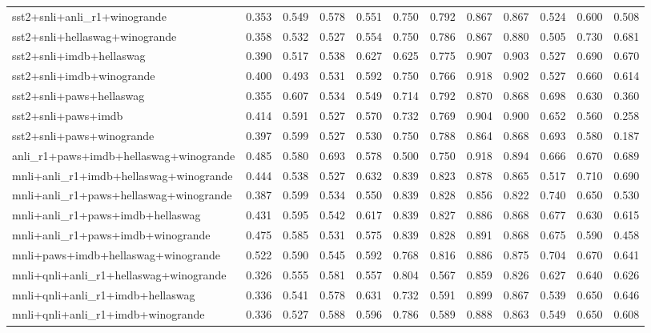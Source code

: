 \begin{table}[t]
\begin{tabular}{lrrrrrrrrrrr}
    sst2+snli+anli\_r1+winogrande & 0.353 & 0.549 & 0.578 & 0.551 & 0.750 & 0.792 & 0.867 & 0.867 & 0.524 & 0.600 & 0.508 \\
    sst2+snli+hellaswag+winogrande & 0.358 & 0.532 & 0.527 & 0.554 & 0.750 & 0.786 & 0.867 & 0.880 & 0.505 & 0.730 & 0.681 \\
    sst2+snli+imdb+hellaswag & 0.390 & 0.517 & 0.538 & 0.627 & 0.625 & 0.775 & 0.907 & 0.903 & 0.527 & 0.690 & 0.670 \\
    sst2+snli+imdb+winogrande & 0.400 & 0.493 & 0.531 & 0.592 & 0.750 & 0.766 & 0.918 & 0.902 & 0.527 & 0.660 & 0.614 \\
    sst2+snli+paws+hellaswag & 0.355 & 0.607 & 0.534 & 0.549 & 0.714 & 0.792 & 0.870 & 0.868 & 0.698 & 0.630 & 0.360 \\
    sst2+snli+paws+imdb & 0.414 & 0.591 & 0.527 & 0.570 & 0.732 & 0.769 & 0.904 & 0.900 & 0.652 & 0.560 & 0.258 \\
    sst2+snli+paws+winogrande & 0.397 & 0.599 & 0.527 & 0.530 & 0.750 & 0.788 & 0.864 & 0.868 & 0.693 & 0.580 & 0.187 \\
    \addlinespace
    anli\_r1+paws+imdb+hellaswag+winogrande & 0.485 & 0.580 & 0.693 & 0.578 & 0.500 & 0.750 & 0.918 & 0.894 & 0.666 & 0.670 & 0.689 \\
    mnli+anli\_r1+imdb+hellaswag+winogrande & 0.444 & 0.538 & 0.527 & 0.632 & 0.839 & 0.823 & 0.878 & 0.865 & 0.517 & 0.710 & 0.690 \\
    mnli+anli\_r1+paws+hellaswag+winogrande & 0.387 & 0.599 & 0.534 & 0.550 & 0.839 & 0.828 & 0.856 & 0.822 & 0.740 & 0.650 & 0.530 \\
    mnli+anli\_r1+paws+imdb+hellaswag & 0.431 & 0.595 & 0.542 & 0.617 & 0.839 & 0.827 & 0.886 & 0.868 & 0.677 & 0.630 & 0.615 \\
    mnli+anli\_r1+paws+imdb+winogrande & 0.475 & 0.585 & 0.531 & 0.575 & 0.839 & 0.828 & 0.891 & 0.868 & 0.675 & 0.590 & 0.458 \\
    mnli+paws+imdb+hellaswag+winogrande & 0.522 & 0.590 & 0.545 & 0.592 & 0.768 & 0.816 & 0.886 & 0.875 & 0.704 & 0.670 & 0.641 \\
    mnli+qnli+anli\_r1+hellaswag+winogrande & 0.326 & 0.555 & 0.581 & 0.557 & 0.804 & 0.567 & 0.859 & 0.826 & 0.627 & 0.640 & 0.626 \\
    mnli+qnli+anli\_r1+imdb+hellaswag & 0.336 & 0.541 & 0.578 & 0.631 & 0.732 & 0.591 & 0.899 & 0.867 & 0.539 & 0.650 & 0.646 \\
    mnli+qnli+anli\_r1+imdb+winogrande & 0.336 & 0.527 & 0.588 & 0.596 & 0.786 & 0.589 & 0.888 & 0.863 & 0.549 & 0.650 & 0.608 \\

\end{tabular}
\end{table}
